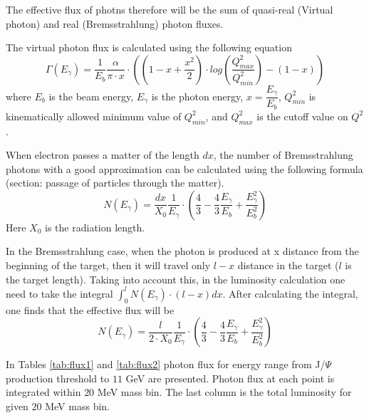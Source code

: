 \documentclass[12pt]{revtex4}
\newcommand{\JP}{J/$\Psi~$}
\begin{document}
 The effective flux of photns therefore will be the sum of quasi-real (Virtual photon) and real
 (Bremsstrahlung) photon fluxes.
 
 The virtual photon flux is calculated using the following
 equation \cite{Phot_Flux1}
 \begin{equation}
  \Gamma(E_{\gamma}) = \frac{1}{E_{b}} \frac{\alpha}{\pi\cdot x}
  \cdot\left( (1 - x + \frac{x^{2}}{2})\cdot log(\frac{Q^{2}_{max}}{Q^{2}_{min}}) - (1 - x)\right)
 \end{equation}
where $E_{b}$ is the beam energy, $E_{\gamma}$ is the photon energy, $x = \dfrac{E_{\gamma}}{E_{b}}$, 
$Q^{2}_{min}$ is kinematically allowed minimum value of $Q^{2}_{min}$, and $Q^{2}_{max}$ is the
cutoff value on $Q^{2}$. 
 
 When electron passes a matter of the length $dx$, the number of Bremsstrahlung photons
 with a good approximation can be calculated using the following formula \cite{PDG} (section: passage of
 particles through the matter).
 \begin{equation}
  N(E_{\gamma}) = \frac{dx}{X_{0}}\frac{1}{E_{\gamma}}\cdot\left( \frac{4}{3} - \frac{4}{3}\frac{E_{\gamma}}{E_{b}} 
   + \frac{E_{\gamma}^{2}}{E_{b}^{2}}\right)
   \label{eq:Bremsstr}
 \end{equation}
Here $X_{0}$ is the radiation length.

In the Bremsstrahlung case, when the photon is produced at x distance from the beginning of the target,
then it will travel only $l-x$ distance in the target ($l$  is the target length). Taking into account this,
in the luminosity calculation one need to take the integral $\int_{0}^{l} N(E_{\gamma})\cdot(l - x) dx $.
After calculating the integral, one finds that the effective flux will be
 \begin{equation}
  N(E_{\gamma}) = \frac{l}{2\cdot X_{0}}\frac{1}{E_{\gamma}}\cdot\left( \frac{4}{3} - \frac{4}{3}\frac{E_{\gamma}}{E_{b}} 
   + \frac{E_{\gamma}^{2}}{E_{b}^{2}}\right)
   \label{eq:Bremsstr_eff}
 \end{equation}

 In Tables \ref{tab:flux1} and \ref{tab:flux2} photon flux for energy range from \JP production threshold to $11$ GeV are presented. Photon flux at each point is integrated within $20$ MeV mass bin. The last column is the total luminosity for given $20$ MeV mass bin. 
\end{document}
